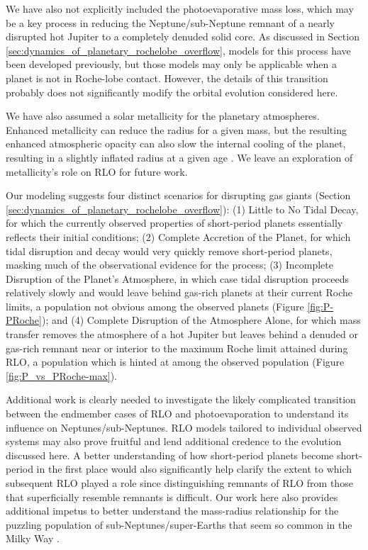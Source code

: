 \documentclass{svjour3}                     %
\begin{document}
We have also not explicitly included the photoevaporative mass loss, which may be a key process in reducing the Neptune/sub-Neptune remnant of a nearly disrupted hot Jupiter to a completely denuded solid core. As discussed in Section \ref{sec:dynamics_of_planetary_rochelobe_overflow}, models for this process have been developed previously, but those models may only be applicable when a planet is not in Roche-lobe contact. However, the details of this transition probably does not significantly modify the orbital evolution considered here.

We have also assumed a solar metallicity for the planetary atmospheres. Enhanced metallicity can reduce the radius for a given mass, but the resulting enhanced atmospheric opacity can also slow the internal cooling of the planet, resulting in a slightly inflated radius at a given age \cite{2007ApJ...661..502B}. We leave an exploration of metallicity's role on RLO for future work.

Our modeling suggests four distinct scenarios for disrupting gas giants (Section \ref{sec:dynamics_of_planetary_rochelobe_overflow}): (1) Little to No Tidal Decay, for which the currently observed properties of short-period planets essentially reflects their initial conditions; (2) Complete Accretion of the Planet, for which tidal disruption and decay would very quickly remove short-period planets, masking much of the observational evidence for the process; (3) Incomplete Disruption of the Planet's Atmosphere, in which case tidal disruption proceeds relatively slowly and would leave behind gas-rich planets at their current Roche limits, a population not obvious among the observed planets (Figure \ref{fig:P-PRoche}); and (4) Complete Disruption of the Atmosphere Alone, for which mass transfer removes the atmosphere of a hot Jupiter but leaves behind a denuded or gas-rich remnant near or interior to the maximum Roche limit attained during RLO, a population which is hinted at among the observed population (Figure \ref{fig:P_vs_PRoche-max}). 

Additional work is clearly needed to investigate the likely complicated transition between the endmember cases of RLO and photoevaporation to understand its influence on Neptunes/sub-Neptunes. RLO models tailored to individual observed systems may also prove fruitful and lend additional credence to the evolution discussed here. A better understanding of how short-period planets become short-period in the first place would also significantly help clarify the extent to which subsequent RLO played a role since distinguishing remnants of RLO from those that superficially resemble remnants is difficult. Our work here also provides additional impetus to better understand the mass-radius relationship for the puzzling population of sub-Neptunes/super-Earths that seem so common in the Milky Way \cite{2014PNAS..11112655M}. 
\end{document}
